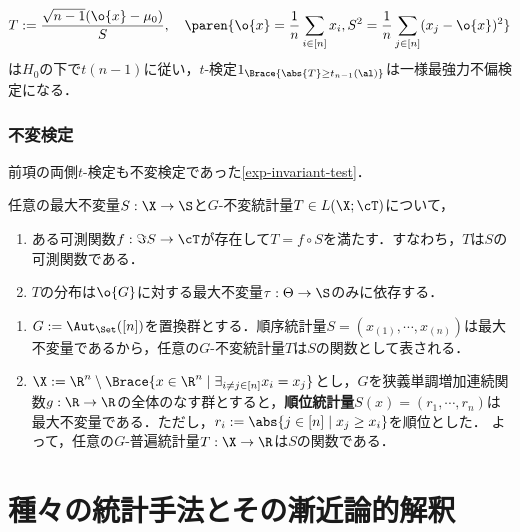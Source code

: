 \documentclass[uplatex,dvipdfmx]{jsreport}
\begin{document}
\begin{proposition}
    \[T:=\frac{\sqrt{n-1}(\o{x}-\mu_0)}{S},\quad\paren{\o{x}=\frac{1}{n}\sum_{i\in[n]}x_i,S^2=\frac{1}{n}\sum_{j\in[n]}(x_j-\o{x})^2}\]
    は$H_0$の下で$t(n-1)$に従い，$t$-検定$1_{\Brace{\abs{T}\ge t_{n-1}(\al)}}$は一様最強力不偏検定になる．
\end{proposition}

\subsection{不変検定}

\begin{tcolorbox}[colframe=ForestGreen, colback=ForestGreen!10!white,breakable,colbacktitle=ForestGreen!40!white,coltitle=black,fonttitle=\bfseries\sffamily,
title=]
    前項の両側$t$-検定も不変検定であった\ref{exp-invariant-test}．
\end{tcolorbox}

\begin{proposition}
    任意の最大不変量$S:\X\to\S$と$G$-不変統計量$T\in L(\X;\cT)$について，
    \begin{enumerate}
        \item ある可測関数$f:\Im S\to\cT$が存在して$T=f\circ S$を満たす．すなわち，$T$は$S$の可測関数である．
        \item $T$の分布は$\o{G}$に対する最大不変量$\tau:\Theta\to\S$のみに依存する．
    \end{enumerate}
\end{proposition}

\begin{example}\mbox{}
    \begin{enumerate}
        \item $G:=\Aut_\Set([n])$を置換群とする．順序統計量$S=(x_{(1)},\cdots,x_{(n)})$は最大不変量であるから，任意の$G$-不変統計量$T$は$S$の関数として表される．
        \item $\X:=\R^n\setminus\Brace{x\in\R^n\mid\exists_{i\ne j\in[n]}x_i=x_j}$とし，$G$を狭義単調増加連続関数$g:\R\to\R$の全体のなす群とすると，\textbf{順位統計量}$S(x)=(r_1,\cdots,r_n)$は最大不変量である．ただし，$r_i:=\abs{j\in[n]\mid x_j\ge x_i}$を順位とした．
        よって，任意の$G$-普遍統計量$T:\X\to\R$は$S$の関数である．
    \end{enumerate}
\end{example}

\chapter{種々の統計手法とその漸近論的解釈}
\end{document}
